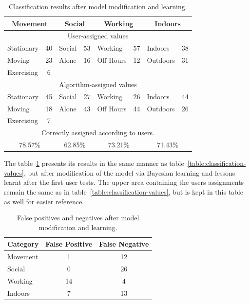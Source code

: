 \begin{table}
    \centering
    {\begin{tabular}{ | l | c | l | c | l | c | l | c |}
        \hline
            \multicolumn{2}{|c|}{Movement} &
            \multicolumn{2}{|c|}{Social}   &
            \multicolumn{2}{|c|}{Working}  &
            \multicolumn{2}{|c|}{Indoors} \\
        \hline
            \multicolumn{8}{|c|}{User-assigned values} \\
        \hline
        Stationary  & 40 & Social & 53 & Working    & 57 & Indoors  & 38 \\
        Moving      & 23 & Alone  & 16 & Off Hours  & 12 & Outdoors & 31 \\
        Exercising  &  6 &        &    &            &    &          &    \\
        \hline
            \multicolumn{8}{|c|}{Algorithm-assigned values} \\
        \hline
        Stationary  & 45 & Social & 27 & Working    & 26 & Indoors  & 44 \\
        Moving      & 18 & Alone  & 43 & Off Hours  & 44 & Outdoors & 26 \\
        Exercising  &  7 &        &    &            &    &          &    \\
        \hline
            \multicolumn{8}{|c|}{Correctly assigned according to users.} \\
        \hline
            \multicolumn{2}{|c|}{78.57\%} &
            \multicolumn{2}{|c|}{62.85\%} &
            \multicolumn{2}{|c|}{73.21\%} &
            \multicolumn{2}{|c|}{71.43\%} \\
        \hline
    \end{tabular}}
    \caption{Classification results after model modification and learning. } 
    \label{table:classification-after-values}
\end{table}

The table~\ref{table:classification-after-values} presents its results in the
same manner as table~\ref{table:classification-values}, but after modification 
of the model via Bayesian learning and lessons learnt after the first user tests. 
The upper area containing the  users assignments remain the same as in 
table~\ref{table:classification-values}, but is kept in this table as well 
for easier reference.

\begin{table}
    \centering
    {\begin{tabular}{ | l | c | c |}
        \hline
            Category & False Positive & False Negative \\
        \hline
        Movement    & 1     & 12 \\
        Social      & 0     & 26 \\
        Working     & 14    & 4  \\
        Indoors     & 7     & 13 \\
        \hline
    \end{tabular}}
    \caption{False positives and negatives after model modification and learning. } 
    \label{table:false-values-after}
\end{table}

